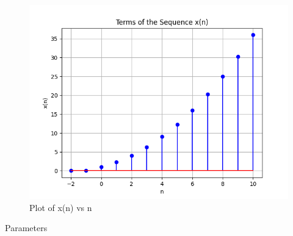 \documentclass[journal,12pt,twocolumn]{IEEEtran}
\begin{document}
\begin{figure}[h]
   \centering
   \includegraphics[width=1\columnwidth]{figs/plot.png}
   \caption{Plot of x(n) vs n}
   \label {fig: 11.9.5.25.1}
\end{figure}

\begin{table}[h]
    \centering
    
    \caption{Parameters}
    \label{tab: 11.9.5.25.1}
\end{table}
\end{document}
